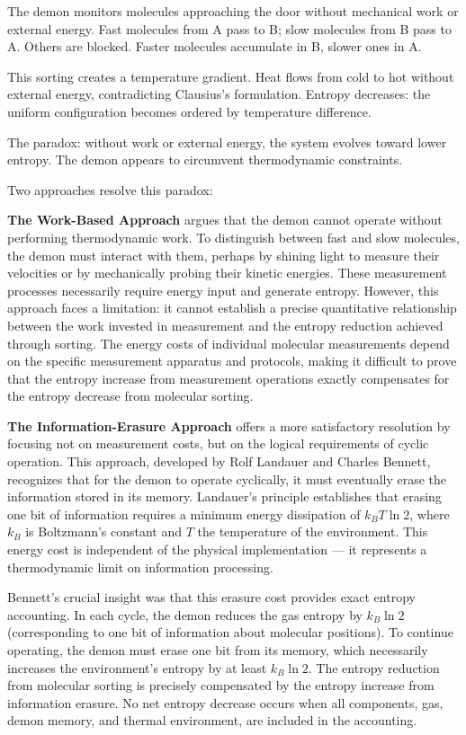 The demon monitors molecules approaching the door without mechanical work or external energy. Fast molecules from A pass to B; slow molecules from B pass to A. Others are blocked. Faster molecules accumulate in B, slower ones in A.

This sorting creates a temperature gradient. Heat flows from cold to hot without external energy, contradicting Clausius's formulation. Entropy decreases: the uniform configuration becomes ordered by temperature difference.

The paradox: without work or external energy, the system evolves toward lower entropy. The demon appears to circumvent thermodynamic constraints.

Two approaches resolve this paradox:

\textbf{The Work-Based Approach} argues that the demon cannot operate without performing thermodynamic work. To distinguish between fast and slow molecules, the demon must interact with them, perhaps by shining light to measure their velocities or by mechanically probing their kinetic energies. These measurement processes necessarily require energy input and generate entropy. However, this approach faces a limitation: it cannot establish a precise quantitative relationship between the work invested in measurement and the entropy reduction achieved through sorting. The energy costs of individual molecular measurements depend on the specific measurement apparatus and protocols, making it difficult to prove that the entropy increase from measurement operations exactly compensates for the entropy decrease from molecular sorting.

\textbf{The Information-Erasure Approach} offers a more satisfactory resolution by focusing not on measurement costs, but on the logical requirements of cyclic operation. This approach, developed by Rolf Landauer and Charles Bennett, recognizes that for the demon to operate cyclically, it must eventually erase the information stored in its memory. Landauer's principle establishes that erasing one bit of information requires a minimum energy dissipation of $k_B T \ln 2$, where $k_B$ is Boltzmann's constant and $T$ the temperature of the environment. This energy cost is independent of the physical implementation — it represents a thermodynamic limit on information processing.

Bennett's crucial insight was that this erasure cost provides exact entropy accounting. In each cycle, the demon reduces the gas entropy by $k_B \ln 2$ (corresponding to one bit of information about molecular positions). To continue operating, the demon must erase one bit from its memory, which necessarily increases the environment's entropy by at least $k_B \ln 2$. The entropy reduction from molecular sorting is precisely compensated by the entropy increase from information erasure. No net entropy decrease occurs when all components, gas, demon memory, and thermal environment, are included in the accounting.

